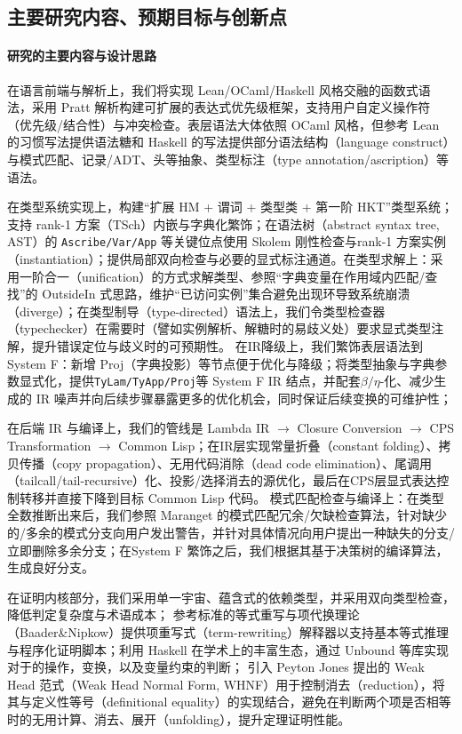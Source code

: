 \documentclass[a4paper, 11pt]{article}
\theoremstyle{remark}\newtheorem*{remark}{Remark}
\theoremstyle{definition}\newtheorem*{definition}{Definition}
\begin{document}
\subsection{主要研究内容、预期目标与创新点}
\paragraph{研究的主要内容与设计思路}

在语言前端与解析上，我们将实现 Lean/OCaml/Haskell 风格交融的函数式语法，采用 Pratt 解析构建可扩展的表达式优先级框架，支持用户自定义操作符（优先级/结合性）与冲突检查。表层语法大体依照 OCaml 风格，但参考 Lean 的习惯写法提供语法糖和 Haskell 的写法提供部分语法结构（language construct）与模式匹配、记录/ADT、头等抽象、类型标注（type annotation/ascription）等语法。

在类型系统实现上，构建“扩展 HM + 谓词 + 类型类 + 第一阶 HKT”类型系统；支持 rank-1 方案（TSch）内嵌与字典化繁饰；在语法树（abstract syntax tree, AST）的 \texttt{Ascribe/Var/App} 等关键位点使用 Skolem 刚性检查与rank-1 方案实例（instantiation）；提供局部双向检查与必要的显式标注通道。在类型求解上：采用一阶合一（unification）的方式求解类型、参照“字典变量在作用域内匹配/查找”的 OutsideIn 式思路，维护“已访问实例”集合避免出现环导致系统崩溃（diverge）；在类型制导（type-directed）语法上，我们令类型检查器（typechecker）在需要时（譬如实例解析、解糖时的易歧义处）要求显式类型注解，提升错误定位与歧义时的可预期性。
在IR降级上，我们繁饰表层语法到 System F：新增 Proj（字典投影）等节点便于优化与降级；将类型抽象与字典参数显式化，提供\texttt{TyLam/TyApp/Proj}等 System F IR 结点，并配套$\beta/\eta$-化、减少生成的 IR 噪声并向后续步骤暴露更多的优化机会，同时保证后续变换的可维护性；

在后端 IR 与编译上，我们的管线是 Lambda IR $\to$ Closure Conversion $\to$ CPS Transformation $\to$ Common Lisp；在IR层实现常量折叠（constant folding）、拷贝传播（copy propagation）、无用代码消除（dead code elimination）、尾调用（tailcall/tail-recursive）化、投影/选择消去的源优化，最后在CPS层显式表达控制转移并直接下降到目标 Common Lisp 代码。
模式匹配检查与编译上：在类型全数推断出来后，我们参照 Maranget 的模式匹配冗余/欠缺检查算法，针对缺少的/多余的模式分支向用户发出警告，并针对具体情况向用户提出一种缺失的分支/立即删除多余分支；在System F 繁饰之后，我们根据其基于决策树的编译算法，生成良好分支。

在证明内核部分，我们采用单一宇宙、蕴含式的依赖类型\lambdacalc，并采用双向类型检查，降低判定复杂度与术语成本；
参考标准的等式重写与项代换理论（Baader\&Nipkow）提供项重写式（term-rewriting）解释器以支持基本等式推理与程序化证明脚本；利用 Haskell 在学术上的丰富生态，通过 Unbound 等库实现对于\lambdaterm 的操作，变换，以及变量约束的判断；
引入 Peyton Jones 提出的 Weak Head 范式（Weak Head Normal Form, WHNF）用于控制消去（reduction），将其与定义性等号（definitional equality）的实现结合，避免在判断两个项是否相等时的无用计算、消去、展开（unfolding），提升定理证明性能。
\end{document}
